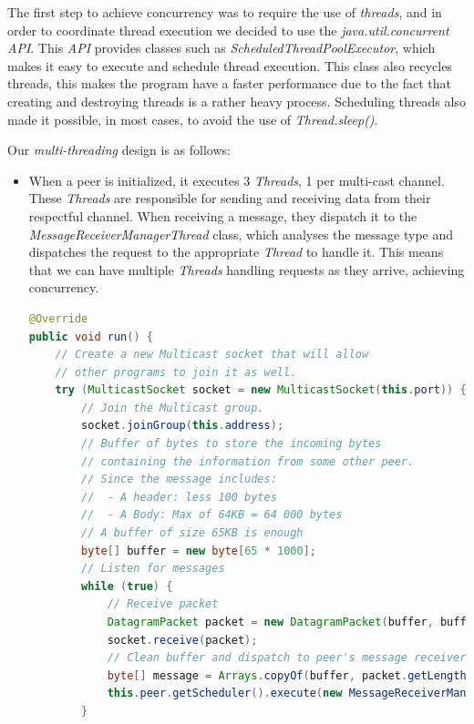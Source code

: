\documentclass[a4paper]{article}
\begin{document}
    The first step to achieve concurrency was to require the use of \textit{threads}, and in order to coordinate thread execution we decided to use the \textit{java.util.concurrent} \textit{API}. This \textit{API} provides classes such as \textit{ScheduledThreadPoolExecutor}, which makes it easy to execute and schedule thread execution. This class also recycles threads, this makes the program have a faster performance due to the fact that creating and destroying threads is a rather heavy process. Scheduling threads also made it possible, in most cases, to avoid the use of \textit{Thread.sleep()}.
    \newline
    
    Our \textit{multi-threading} design is as follows:
    
    \begin{itemize}
        \item When a peer is initialized, it executes 3 \textit{Threads}, 1 per multi-cast channel. These \textit{Threads} are responsible for sending and receiving data from their respectful channel. When receiving a message, they dispatch it to the \textit{MessageReceiverManagerThread} class, which analyses the message type and dispatches the request to the appropriate \textit{Thread} to handle it. This means that we can have multiple \textit{Threads} handling requests as they arrive, achieving concurrency.
        
\begin{lstlisting}[language=Java, caption=Channel Class \textit{run} Method]
@Override
public void run() {
    // Create a new Multicast socket that will allow
    // other programs to join it as well.
    try (MulticastSocket socket = new MulticastSocket(this.port)) {
        // Join the Multicast group.
        socket.joinGroup(this.address);
        // Buffer of bytes to store the incoming bytes
        // containing the information from some other peer.
        // Since the message includes:
        //  - A header: less 100 bytes
        //  - A Body: Max of 64KB = 64 000 bytes
        // A buffer of size 65KB is enough
        byte[] buffer = new byte[65 * 1000];
        // Listen for messages
        while (true) {
            // Receive packet
            DatagramPacket packet = new DatagramPacket(buffer, buffer.length);
            socket.receive(packet);
            // Clean buffer and dispatch to peer's message receiver managing thread
            byte[] message = Arrays.copyOf(buffer, packet.getLength());
            this.peer.getScheduler().execute(new MessageReceiverManagerThread(message, this.peer));
        }


\end{lstlisting}
\end{itemize}
\end{document}
